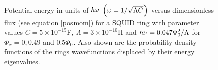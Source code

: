 \documentclass[12pt,a4paper,superscriptaddress,showpacs,floatfix,pra]{revtex4-2}
\begin{document}
\begin{figure}[!t]
\begin{center}
\end{center}
\caption{Potential energy in units  of $\hbar \protect\omega $ $\left(
\protect\omega    =1/\protect\sqrt{\Lambda    C}\right)    $    versus
dimensionless  flux (see  equation \protect\ref{posmom})  for  a SQUID
ring  with parameter values  $C=5\times 10^{-15}$F,  $\Lambda =3\times
10^{-10}$H  and $\hbar \protect\nu  =0.047\Phi _{0}^{2}/\Lambda  $ for
$\Phi _{x}=0,0.49$ and $0.5\Phi _{0}$.  Also shown are the probability
density functions of the rings wavefunctions displaced by their energy
eigenvalues.}
\label{f1}
\end{figure}
\end{document}
